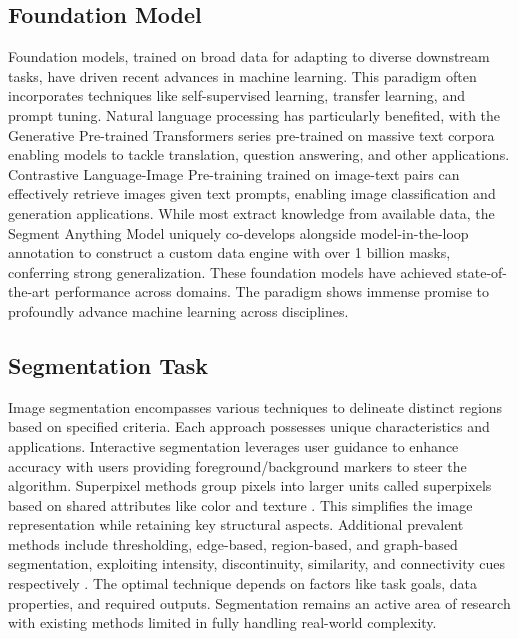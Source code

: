 \documentclass[lettersize,journal]{IEEEtran}
\begin{document}
\subsection{Foundation Model}
Foundation models, trained on broad data for adapting to diverse downstream tasks, have driven recent advances in machine learning. 
This paradigm often incorporates techniques like self-supervised learning, transfer learning, and prompt tuning. 
Natural language processing has particularly benefited, 
with the Generative Pre-trained Transformers \cite{bubeck2023sparks,floridi2020gpt} series pre-trained on massive text corpora enabling models \cite{brown2020language, hu2020gpt} to tackle translation, 
question answering, and other applications. 
Contrastive Language-Image Pre-training \cite{radford2021learning, li2021supervision} trained on image-text pairs 
can effectively retrieve images given text prompts, 
enabling image classification and generation applications. 
While most extract knowledge from available data, 
the Segment Anything Model \cite{kirillov2023segment} uniquely co-develops alongside model-in-the-loop annotation to construct a custom data engine 
with over 1 billion masks, 
conferring strong generalization. 
These foundation models \cite{bommasani2021opportunities, yuan2021florence, touvron2023llama} have achieved state-of-the-art performance across domains. 
The paradigm shows immense promise to profoundly advance machine learning across disciplines.


\subsection{Segmentation Task}
Image segmentation \cite{pal1993review,cheng2001color} encompasses various techniques to delineate distinct regions based on specified criteria. 
Each approach possesses unique characteristics and applications. 
Interactive segmentation leverages user guidance to enhance accuracy \cite{mcguinness2010comparative, mortensen1998interactive}
with users providing foreground/background markers to steer the algorithm. 
Superpixel methods group pixels into larger units called superpixels based on shared attributes like color and texture \cite{liu2011entropy}. 
This simplifies the image representation while retaining key structural aspects. 
Additional prevalent methods include thresholding, edge-based, region-based, 
and graph-based segmentation, exploiting intensity, discontinuity, similarity, and connectivity cues respectively \cite{haralick1985image}. 
The optimal technique depends on factors like task goals, data properties, and required outputs. 
Segmentation \cite{minaee2021image} remains an active area of research with existing methods limited in fully handling real-world complexity. 
\end{document}
